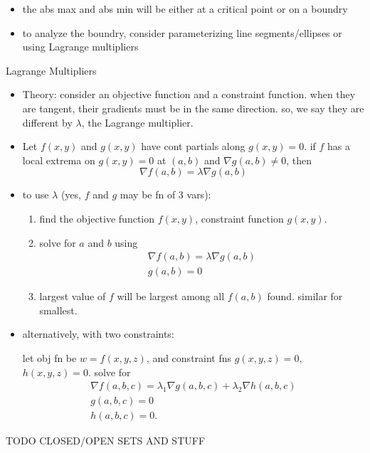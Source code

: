 \documentclass[11pt]{article}
\theoremstyle{definition}
\newcommand{\col}[1]{\begin{minipage}{\columnwidth}#1\end{minipage}}
\begin{document}
\begin{multicols}{2}
{\begin{itemize}
      a cont function on a closed and bounded set has an abs min and abs max in the set
      \item the abs max and abs min will be either at a critical point or on a boundry
      \item to analyze the boundry, consider parameterizing line segments/ellipses or using Lagrange multipliers
    \end{itemize}
  }
  \col{
    Lagrange Multipliers
    \begin{itemize}
      \item Theory: consider an objective function and a constraint function. when they are tangent, their gradients must be in the same direction. so, we say they are different by $\lambda$, the Lagrange multiplier.
      \item Let $f(x,y)$ and $g(x,y)$ have cont partials along $g(x,y)=0$. if $f$ has a local extrema on $g(x,y)=0$ at $(a,b)$ and $\nabla g(a,b) \ne 0$, then
      \[ \nabla f(a,b) = \lambda \nabla g(a,b) \]
      \item to use $\lambda$ (yes, $f$ and $g$ may be fn of 3 vars):
      \begin{enumerate}
        \item find the objective function $f(x,y)$, constraint function $g(x,y)$.
        \item solve for $a$ and $b$ using
        \begin{gather*}
          \nabla f(a,b) = \lambda\nabla g(a,b) \\
          g(a,b)=0
        \end{gather*}
        \item largest value of $f$ will be largest among all $f(a,b)$ found. similar for smallest.
      \end{enumerate}
      \item alternatively, with two constraints:
      
      let obj fn be $w=f(x,y,z)$, and constraint fns $g(x,y,z)=0$, $h(x,y,z)=0$. solve for
      \begin{gather*}
        \nabla f(a,b,c) = \lambda_1\nabla g(a,b,c) + \lambda_2\nabla h(a,b,c) \\
        g(a,b,c) = 0 \\
        h(a,b,c) = 0.
      \end{gather*}
    \end{itemize}
    TODO CLOSED/OPEN SETS AND STUFF
  }
\end{multicols}
\end{document}
